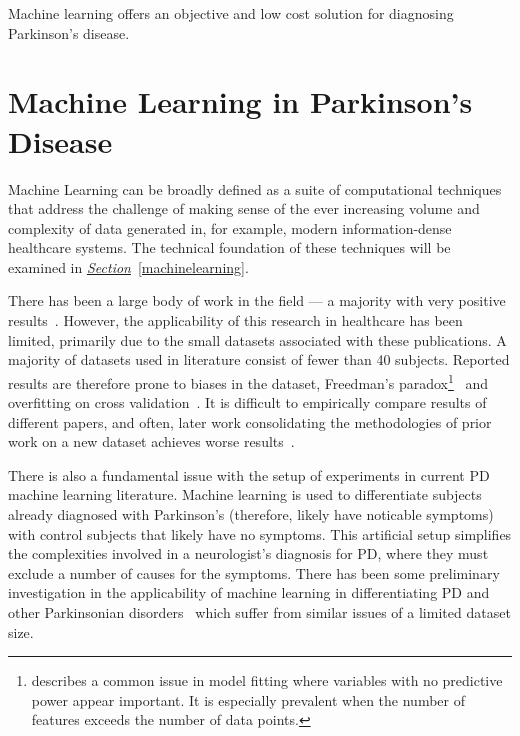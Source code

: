 \documentclass[12pt, twoside]{book}
\renewcommand\emph[1]{\textit{\color{USred}{#1}}}
\begin{document}
\begin{highlight}
Machine learning offers an objective and low cost solution for diagnosing Parkinson's disease.
\end{highlight}

\section{Machine Learning in Parkinson's Disease}
\label{mlpd}
Machine Learning can be broadly defined as a suite of computational techniques that address the challenge of making sense of the ever increasing volume and complexity of data generated in, for example, modern information-dense healthcare systems. The technical foundation of these techniques will be examined in \textit{\hyperref[machinelearning]{Section}}~\ref{machinelearning}.

There has been a large body of work in the field --- a majority with very positive results~\cite{tsanas2012novel, arora2014high}. However, the applicability of this research in healthcare has been limited, primarily due to the small datasets associated with these publications. A majority of datasets used in literature consist of fewer than 40 subjects. Reported results are therefore prone to biases in the dataset, Freedman's paradox\footnote{\emph{Freedman's paradox} describes a common issue in model fitting where variables with no predictive power appear important. It is especially prevalent when the number of features exceeds the number of data points.}~\cite{freedmanparadox} and overfitting on cross validation~\cite{overfittingcv}. It is difficult to empirically compare results of different papers, and often, later work consolidating the methodologies of prior work on a new dataset achieves worse results~\cite{zhan2016high}.



There is also a fundamental issue with the setup of experiments in current PD machine learning literature. Machine learning is used to differentiate subjects already diagnosed with Parkinson's (therefore, likely have noticable symptoms) with control subjects that likely have no symptoms. This artificial setup simplifies the complexities involved in a neurologist's diagnosis for PD, where they must exclude a number of causes for the symptoms. There has been some preliminary investigation in the applicability of machine learning in differentiating PD and other Parkinsonian disorders~\cite{esser2011assessment, PDessentialtremordifferentiation} which suffer from similar issues of a limited dataset size.
\end{document}
